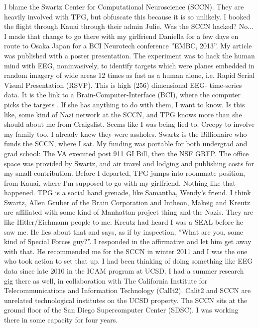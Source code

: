 \documentclass{article}
\begin{document}
\begin{multicols}{2}
I blame the Swartz Center for Computational Neuroscience (SCCN). They are heavily involved with TPG, but obfuscate this because it is so unlikely. I booked the flight through Kauai through their admin Julie. Was the SCCN hacked? No... I made that change to go there with my girlfriend Daniella for a few days en route to Osaka Japan for a BCI Neurotech conference ''EMBC, 2013''. My article was published with a poster presentation. The experiment was to hack the human mind with EEG, noninvasively, to identify targets which were planes embedded in random imagery of wide areas 12 times as fast as a human alone, i.e. Rapid Serial Visual Presentation (RSVP). This is high (256) dimensional EEG- time-series data. It is the link to a Brain-Computer-Interface (BCI), where the computer picks the targets \cite{rerp}. If she has anything to do with them, I want to know. Is this like, some kind of Nazi network at the SCCN, and TPG knows more than she should about me from Craigslist. Seems like I was being lied to. Creepy to involve my family too. I already knew they were assholes. Swartz is the Billionaire who funds the SCCN, where I sat. My funding was portable for both undergrad and grad school: The VA executed post 911 GI Bill, then the NSF GRFP. The office space was provided by Swartz, and air travel and lodging and publishing costs for my small contribution. Before I departed, TPG jumps into roommate position, from Kauai, where I'm supposed to go with my girlfriend. Nothing like that happened. TPG is a social hand grenade, like Samantha, Wendy's friend. I think Swartz, Allen Gruber of the Brain Corporation and Intheon, Makeig and Kreutz are affiliated with some kind of Manhattan project thing and the Nazis. They are like Hitler/Eichmann people to me. Kreutz had heard I was a SEAL before he saw me. He lies about that and says, as if by inspection, ''What are you, some kind of Special Forces guy?''. I responded in the affirmative and let him get away with that. He recommended me for the SCCN in winter 2011 and I was the one who took action to set that up. I had been thinking of doing something like EEG data since late 2010 in the ICAM program at UCSD. I had a summer research gig there as well, in collaboration with The California Institute for Telecommunications and Information Technology (CalIt2). Calit2 and SCCN are unrelated technological institutes on the UCSD property. The SCCN sits at the ground floor of the San Diego Supercomputer Center (SDSC). I was working there in some capacity for four years. 


\end{multicols}
\end{document}
